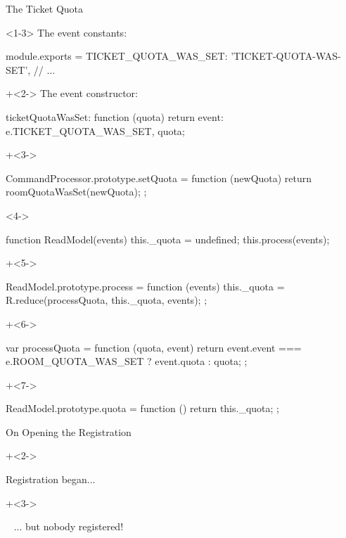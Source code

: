 \begin{frame}[fragile]{The Ticket Quota}

\begin{onlyenv}<1-3>
The event constants:

\begin{highlight}{1}
module.exports = {
  TICKET_QUOTA_WAS_SET: 'TICKET-QUOTA-WAS-SET',
  // ...
}
\end{highlight}

\onslide+<2->
The event constructor:

\begin{highlight}{2}
ticketQuotaWasSet: function (quota) {
    return {event: e.TICKET_QUOTA_WAS_SET, quota};
}
\end{highlight}

\onslide+<3->
\begin{highlight}{3}
CommandProcessor.prototype.setQuota = function (newQuota) {
  return roomQuotaWasSet(newQuota);
};
\end{highlight}
\end{onlyenv}

\begin{onlyenv}<4->
\begin{highlight}{4}
function ReadModel(events) {
  this._quota = undefined;
  this.process(events);
}
\end{highlight}
\onslide+<5->
\begin{highlight}{5}
ReadModel.prototype.process = function (events) {
  this._quota = R.reduce(processQuota, this._quota, events);
};
\end{highlight}
\onslide+<6->
\begin{highlight}{6}
var processQuota = function (quota, event) {
  return event.event === e.ROOM_QUOTA_WAS_SET ? event.quota : quota;
};
\end{highlight}
\onslide+<7->
\begin{highlight}{7}
ReadModel.prototype.quota = function () {
  return this._quota;
};
\end{highlight}
\end{onlyenv}

\end{frame}

\begin{frame}[fragile]{On Opening the Registration}

\onslide+<2->

Registration began...

\onslide+<3->

\vspace{3em}

~ \hspace{10em} ... but nobody registered!
 
\end{frame}


